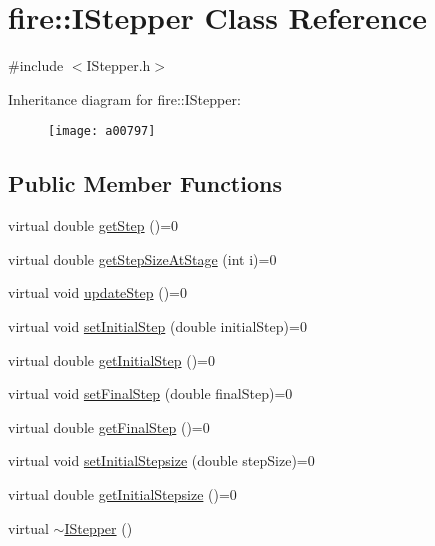 \hypertarget{a00797}{}\section{fire\+:\+:I\+Stepper Class Reference}
\label{a00797}


{\ttfamily \#include $<$I\+Stepper.\+h$>$}

Inheritance diagram for fire\+:\+:I\+Stepper\+:\begin{figure}[H]
\begin{center}
\leavevmode
\texttt{[image: a00797]}
\end{center}
\end{figure}
\subsection*{Public Member Functions}
\begin{DoxyCompactItemize}
\item 
virtual double \hyperlink{a00797_a7f709d1462a2a3b8bd8214cc681ca26e}{get\+Step} ()=0
\item 
virtual double \hyperlink{a00797_a43027c0c268afcd59db8815c2e2c41ea}{get\+Step\+Size\+At\+Stage} (int i)=0
\item 
virtual void \hyperlink{a00797_a44dfccb90ee5ef6e080b54113c215458}{update\+Step} ()=0
\item 
virtual void \hyperlink{a00797_a3a5099cd0f3c874e56c33cb8f13b8f3b}{set\+Initial\+Step} (double initial\+Step)=0
\item 
virtual double \hyperlink{a00797_a49df3a2ac05cebaf2baf387b66d19272}{get\+Initial\+Step} ()=0
\item 
virtual void \hyperlink{a00797_add76974a7b6fbbc93916270a376c461e}{set\+Final\+Step} (double final\+Step)=0
\item 
virtual double \hyperlink{a00797_ab234d9f032e02668aededf1c22e8c0a9}{get\+Final\+Step} ()=0
\item 
virtual void \hyperlink{a00797_a69c262f248511efcd271be1724a41ad9}{set\+Initial\+Stepsize} (double step\+Size)=0
\item 
virtual double \hyperlink{a00797_afb777e62386b25e5a38d59af54972690}{get\+Initial\+Stepsize} ()=0
\item 
virtual \hyperlink{a00797_ac8ec460d35512e2e039396d5192eb57e}{$\sim$\+I\+Stepper} ()
\end{DoxyCompactItemize}


